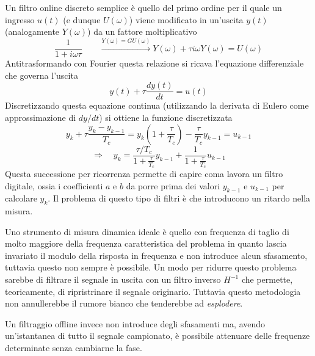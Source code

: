 	Un filtro online discreto semplice è quello del primo ordine per il quale un ingresso $u(t)$ (e dunque $U(\omega)$) viene modificato in un'uscita $y(t)$ (analogamente $Y(\omega)$) da un fattore moltiplicativo
	\[ \frac 1 {1 + i\omega \tau} \qquad \xrightarrow{Y(\omega) = G U(\omega)} Y(\omega) + \tau i \omega Y(\omega) = U(\omega) \]
	Antitrasformando con Fourier questa relazione si ricava l'equazione differenziale che governa l'uscita
	\[y(t) + \tau \frac{dy(t)}{dt} = u(t)\]
	Discretizzando questa equazione continua (utilizzando la derivata di Eulero come approssimazione di $dy/dt$) si ottiene la funzione discretizzata
	\[ y_k + \tau \frac{y_k - y_{k-1}}{T_c} = y_k \left(1 + \frac \tau {T_c} \right) - \frac \tau {T_c} y_{k-1} = u_{k-1} \]
	\[  \Rightarrow \quad y_k = \frac{\tau / T_c}{1 + \frac{\tau}{T_c}} y_{k-1} + \frac 1  { 1+ \frac \tau {T_c}} u_{k-1} \]
	Questa successione per ricorrenza permette di capire coma lavora un filtro digitale, ossia i coefficienti $a$ e $b$ da porre prima dei valori $y_{k-1}$ e $u_{k-1}$ per calcolare $y_k$. Il problema di questo tipo di filtri è che introducono un ritardo nella misura.
	
	Uno strumento di misura dinamica ideale è quello con frequenza di taglio di molto maggiore della frequenza caratteristica del problema in quanto lascia invariato il modulo della risposta in frequenza e non introduce alcun sfasamento, tuttavia questo non sempre è possibile. Un modo per ridurre questo problema sarebbe di filtrare il segnale in uscita con un filtro inverso $H^{-1}$ che permette, teoricamente, di ripristrinare il segnale originario. Tuttavia questo metodologia non annullerebbe il rumore bianco che tenderebbe ad \textit{esplodere}. 
	
	\vspace{3mm}
	Un filtraggio offline invece non introduce degli sfasamenti ma, avendo un'istantanea di tutto il segnale campionato, è possibile attenuare delle frequenze determinate senza cambiarne la fase.
	
	
	
	
	
